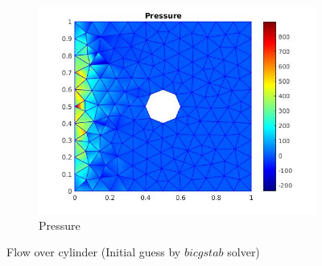 \documentclass{beamer}
\begin{document}
\begin{frame}
\begin{figure}
\begin{subfigure}{0.3\textwidth}
    \includegraphics[width=\linewidth]{cylinder_newton_pressure_bicgstab.jpg}
    \caption{Pressure}
  \label{pressure_navier_stoke_bicgstab}
  \end{subfigure}
\caption{Flow over cylinder (Initial guess by $bicgstab$ solver)}
\label{flow_over_cylinder_bicgstab_n_s}
\end{figure}
\end{frame}
\end{document}
